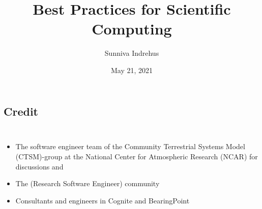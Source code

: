\documentclass[usenames,dvipsnames]{beamer}
\theoremstyle{plain}
\theoremstyle{definition}
\begin{document}
\title{Best Practices for Scientific Computing}
 \institute{
A lavterskel talk 
 }

 \author{Sunniva Indrehus }


 \date{\scriptsize May 21, 2021}

 \vspace{-2.cm}
 \frame{
   \titlepage
   \thispagestyle{empty}
 }


\section{}
\subsection{Credit}


\begin{frame}{\setframetitle{}}
  {
    \begin{columns}
      \begin{itemize}
        \item The software engineer team of the Community Terrestrial Systems Model
          (CTSM)-group at the National Center for Atmospheric Research (NCAR)
          for discussions and \href{https://github.com/ESCOMP/CTSM/wiki/Meeting-Notes-2021-Software#may-13th-2021}{\color{blue}{ideas}}
        \item The \href{https://nordic-rse.org/}{\color{blue}{Nordic-RSE}} (Research Software Engineer) community
        \item Consultants and engineers in Cognite and BearingPoint 
        \end{itemize}

    \end{columns}
  }
\end{frame}
\end{document}
